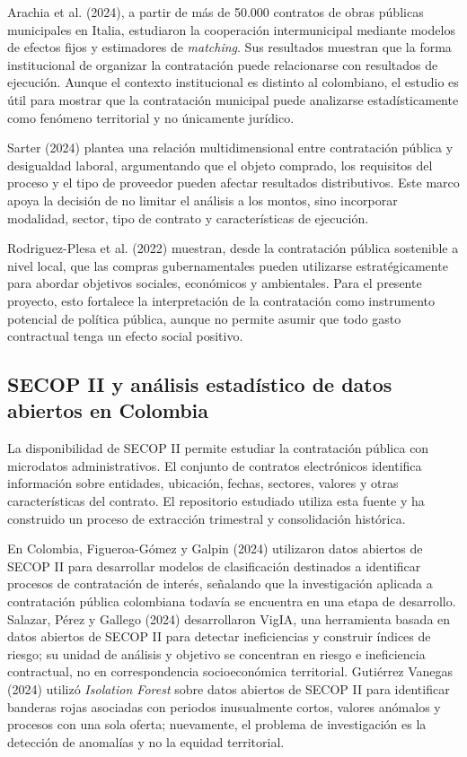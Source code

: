 \documentclass[11pt,letterpaper]{article}
\begin{document}
Arachia et al. (2024), a partir de más de 50.000 contratos de obras públicas
municipales en Italia, estudiaron la cooperación intermunicipal mediante
modelos de efectos fijos y estimadores de \textit{matching}. Sus resultados
muestran que la forma institucional de organizar la contratación puede
relacionarse con resultados de ejecución. Aunque el contexto institucional es
distinto al colombiano, el estudio es útil para mostrar que la contratación
municipal puede analizarse estadísticamente como fenómeno territorial y no
únicamente jurídico.

Sarter (2024) plantea una relación multidimensional entre contratación pública
y desigualdad laboral, argumentando que el objeto comprado, los requisitos del
proceso y el tipo de proveedor pueden afectar resultados distributivos. Este
marco apoya la decisión de no limitar el análisis a los montos, sino incorporar
modalidad, sector, tipo de contrato y características de ejecución.

Rodriguez-Plesa et al. (2022) muestran, desde la contratación pública
sostenible a nivel local, que las compras gubernamentales pueden utilizarse
estratégicamente para abordar objetivos sociales, económicos y ambientales.
Para el presente proyecto, esto fortalece la interpretación de la contratación
como instrumento potencial de política pública, aunque no permite asumir que
todo gasto contractual tenga un efecto social positivo.

\subsection{SECOP II y análisis estadístico de datos abiertos en Colombia}

La disponibilidad de SECOP II permite estudiar la contratación pública con
microdatos administrativos. El conjunto de contratos electrónicos identifica
información sobre entidades, ubicación, fechas, sectores, valores y otras
características del contrato. El repositorio estudiado utiliza esta fuente y ha
construido un proceso de extracción trimestral y consolidación histórica.

En Colombia, Figueroa-Gómez y Galpin (2024) utilizaron datos abiertos de SECOP
II para desarrollar modelos de clasificación destinados a identificar procesos
de contratación de interés, señalando que la investigación aplicada a
contratación pública colombiana todavía se encuentra en una etapa de
desarrollo. Salazar, Pérez y Gallego (2024) desarrollaron VigIA, una
herramienta basada en datos abiertos de SECOP II para detectar ineficiencias y
construir índices de riesgo; su unidad de análisis y objetivo se concentran en
riesgo e ineficiencia contractual, no en correspondencia socioeconómica
territorial. Gutiérrez Vanegas (2024) utilizó \textit{Isolation Forest} sobre
datos abiertos de SECOP II para identificar banderas rojas asociadas con
periodos inusualmente cortos, valores anómalos y procesos con una sola oferta;
nuevamente, el problema de investigación es la detección de anomalías y no la
equidad territorial.
\end{document}
